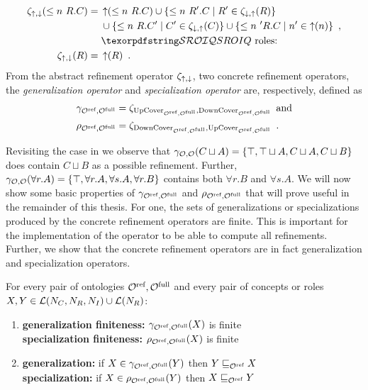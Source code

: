 \begin{definition}
\begin{align*}
    \zeta_{\refine,\corefine}(\less n R.C) ={} & \refine(\less n R.C) \cup \{ \less n R'.C \mid R' \in \zeta_{\corefine,\refine}(R) \} \\
    & \cup \{ \less n R.C' \mid C' \in \zeta_{\corefine,\refine}(C) \}
    \cup \{ \less n' R.C \mid n' \in \refine(n) \} \enspace, \\
    & \text{\SROIQ roles:} \\
    \zeta_{\refine,\corefine}(R) ={} & \refine(R) \enspace.
  \end{align*}
  From the abstract refinement operator $\zeta_{\operatorname{\uparrow},\operatorname{\downarrow}}$, two concrete refinement operators, the \emph{generalization operator} and \emph{specialization operator} are, respectively, defined as
  \begin{align*}
    \gamma_{{\mathcal{O}^\textnormal{ref}},{\mathcal{O}^\textnormal{full}}} &= \zeta_{{\operatorname{UpCover}}_{{\mathcal{O}^\textnormal{ref}},{\mathcal{O}^\textnormal{full}}},{\operatorname{DownCover}}_{{\mathcal{O}^\textnormal{ref}},{\mathcal{O}^\textnormal{full}}}} \enspace \text{and} \\
    \rho_{{\mathcal{O}^\textnormal{ref}},{\mathcal{O}^\textnormal{full}}} &= \zeta_{{\operatorname{DownCover}}_{{\mathcal{O}^\textnormal{ref}},{\mathcal{O}^\textnormal{full}}},{\operatorname{UpCover}}_{{\mathcal{O}^\textnormal{ref}},{\mathcal{O}^\textnormal{full}}}} \enspace.
  \end{align*}
\end{definition}

Revisiting the case in  we observe that $\gamma_{\mathcal{O},\mathcal{O}}(C \sqcup A) = \{ \top, \top \sqcup A, C \sqcup A, C \sqcup B \}$ does contain $C \sqcup B$ as a possible refinement. Further, $\gamma_{\mathcal{O},\mathcal{O}}(\forall r.A) = \{ \top, \forall r.A, \forall s.A, \forall r.B \}$ contains both $\forall r.B$ and $\forall s.A$. We will now show some basic properties of $\gamma_{{\mathcal{O}^\textnormal{ref}},{\mathcal{O}^\textnormal{full}}}$ and $\rho_{{\mathcal{O}^\textnormal{ref}},{\mathcal{O}^\textnormal{full}}}$ that will prove useful in the remainder of this thesis. For one, the sets of generalizations or specializations produced by the concrete refinement operators are finite. This is important for the implementation of the operator to be able to compute all refinements. Further, we show that the concrete refinement operators are in fact generalization and specialization operators.

\begin{lemma}\label{lem:basic}
  For every pair of \SROIQ ontologies ${\mathcal{O}^\textnormal{ref}}, {\mathcal{O}^\textnormal{full}}$ and every pair of concepts or roles $X, Y \in \mathcal{L}(N_C, N_R, N_I) \cup \mathcal{L}(N_R)$:
  \newcommand\litem[1]{\item{\bfseries #1:\enspace }}
  \begin{enumerate}
    \litem{generalization finiteness}\label{lem:finiteness} $\gamma_{{\mathcal{O}^\textnormal{ref}},{\mathcal{O}^\textnormal{full}}}(X)$ is finite \\
    \textbf{specialization finiteness:\enspace} $\rho_{{\mathcal{O}^\textnormal{ref}},{\mathcal{O}^\textnormal{full}}}(X)$ is finite
    \litem{generalization}\label{lem:generalisation} if $X \in \gamma_{{\mathcal{O}^\textnormal{ref}},{\mathcal{O}^\textnormal{full}}}(Y)$ then $Y \sqsubseteq_{{\mathcal{O}^\textnormal{ref}}} X$ \\
    \textbf{specialization:\enspace} if $X \in \rho_{{\mathcal{O}^\textnormal{ref}},{\mathcal{O}^\textnormal{full}}}(Y)$ then $X \sqsubseteq_{{\mathcal{O}^\textnormal{ref}}} Y$
  \end{enumerate}
\end{lemma}

